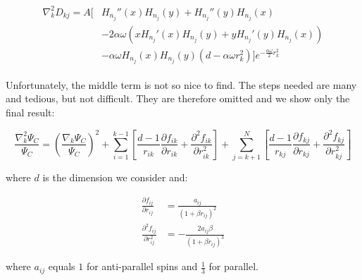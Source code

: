 \documentclass[english, a4paper]{article}
\begin{document}
	\begin{align}
		\begin{split}
		\nabla_k^2D_{kj} = A\Big[&H_{n_j}''(x)H_{n_j}(y) + H_{n_j}''(y)H_{n_j}(x)\\
		&- 2\alpha\omega\left(xH_{n_j}'(x)H_{n_j}(y) + yH_{n_j}'(y)H_{n_j}(x)\right)\\
		&- \alpha\omega H_{n_j}(x)H_{n_j}(y)\left(d - \alpha\omega r_k^2\right)\Big]e^{-\frac{\alpha\omega}{2}r_k^2}
		\end{split}
	\end{align}
	
	Unfortunately, the middle term is not so nice to find. The steps needed are many and tedious, but not difficult. They are therefore omitted and we show only the final result:
	
	\begin{equation}
	\frac{\nabla_k^2 \Psi_C}{\Psi_C} = \left(\frac{\nabla_k\Psi_C}{\Psi_C}\right)^2 + \sum_{i=1}^{k-1}\left[\frac{d-1}{r_{ik}}\frac{\partial f_{ik}}{\partial r_{ik}} + \frac{\partial^2 f_{ik}}{\partial r_{ik}^2}\right] + \sum_{j=k+1}^{N}\left[\frac{d-1}{r_{kj}}\frac{\partial f_{kj}}{\partial r_{kj}} + \frac{\partial^2 f_{kj}}{\partial r_{kj}^2}\right]
	\end{equation}
	
	where $d$ is the dimension we consider and:
	
	\begin{align}
	\frac{\partial f_{ij}}{\partial r_{ij}} &= \frac{a_{ij}}{(1+\beta r_{ij})^2}\\
	\frac{\partial^2 f_{ij}}{\partial r_{ij}^2} &= -\frac{2a_{ij}\beta}{(1+\beta r_{ij})^3}
	\end{align}
	
	where $a_{ij}$ equals $1$ for anti-parallel spins and $\frac{1}{3}$ for parallel.
	
	
\end{document}
